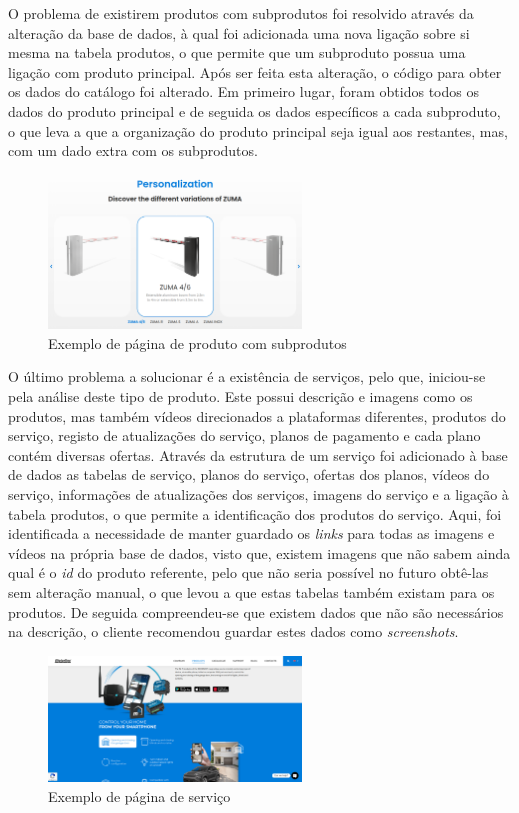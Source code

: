 \newpage

O problema de existirem produtos com subprodutos foi resolvido através da alteração da base de dados, à qual foi adicionada uma nova ligação sobre si mesma na tabela produtos, o que permite que um subproduto possua uma ligação com produto principal. Após ser feita esta alteração, o código para obter os dados do catálogo foi alterado. Em primeiro lugar, foram obtidos todos os dados do produto principal e de seguida os dados específicos a cada subproduto, o que leva a que a organização do produto principal seja igual aos restantes, mas, com um dado extra com os subprodutos. 

\begin{figure}[htb]
  \centering
  \includegraphics[width=0.6\textwidth]{images/implementacao/scraper/zuma.png}
  \caption{Exemplo de página de produto com subprodutos}
  \label{fig:61}
\end{figure}

O último problema a solucionar é a existência de serviços, pelo que, iniciou-se pela análise deste tipo de produto. Este possui descrição e imagens como os produtos, mas também vídeos direcionados a plataformas diferentes, produtos do serviço, registo de atualizações do serviço, planos de pagamento e cada plano contém diversas ofertas. 
Através da estrutura de um serviço foi adicionado à base de dados as tabelas de serviço, planos do serviço, ofertas dos planos, vídeos do serviço, informações de atualizações dos serviços, imagens do serviço e a ligação à tabela produtos, o que permite a identificação dos produtos do serviço. Aqui, foi identificada a necessidade de manter guardado os \textit{links} para todas as imagens e vídeos na própria base de dados, visto que, existem imagens que não sabem ainda qual é o \textit{id} do produto referente, pelo que não seria possível no futuro obtê-las sem alteração manual, o que levou a que estas tabelas também existam para os produtos. De seguida compreendeu-se que existem dados que não são necessários na descrição, o cliente recomendou guardar estes dados como \textit{screenshots}.
\begin{figure}[htb]
  \centering
  \includegraphics[width=0.6\textwidth]{images/implementacao/scraper/mconnect.png}
  \caption{Exemplo de página de serviço}
  \label{fig:62}
\end{figure}


